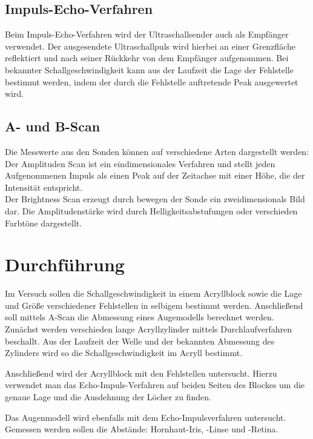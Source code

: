 \subsection{Impuls-Echo-Verfahren}
Beim Impuls-Echo-Verfahren wird der Ultraschallsender auch als Empfänger verwendet. Der ausgesendete Ultraschallpuls wird hierbei an einer Grenzfläche reflektiert und nach seiner Rückkehr von dem Empfänger aufgenommen. Bei bekannter Schallgeschwindigkeit kann aus der Laufzeit die Lage der Fehlstelle bestimmt werden, indem der durch die Fehlstelle auftretende Peak ausgewertet wird.

\subsection{A- und B-Scan}
Die Messwerte aus den Sonden können auf verschiedene Arten dargestellt werden:\\

Der Amplituden Scan ist ein eindimensionales Verfahren und stellt jeden Aufgenommenen Impuls als einen Peak auf der Zeitachse mit einer Höhe, die der Intensität entspricht.\\

Der Brightness Scan erzeugt durch bewegen der Sonde ein zweidimensionals Bild dar. Die Amplitudenstärke wird durch Helligkeitsabstufungen oder verschieden Farbtöne dargestellt.


\section{Durchführung}
Im Versuch sollen die Schallgeschwindigkeit in einem Acryllblock sowie die Lage und Größe verschiedener Fehlstellen in selbigem bestimmt werden. Anschließend soll mittels A-Scan die Abmessung eines Augemodells berechnet werden.\\

Zunächst werden verschieden lange Acryllzylinder mittels Durchlaufverfahren beschallt. Aus der Laufzeit der Welle und der bekannten Abmessung des Zylinders wird so die Schallgeschwindigkeit im Acryll bestimmt.

Anschließend wird der Acryllblock mit den Fehlstellen untersucht. Hierzu verwendet man das Echo-Impuls-Verfahren auf beiden Seiten des Blockes um die genaue Lage und die Ausdehnung der Löcher zu finden.

Das Augenmodell wird ebenfalls mit dem Echo-Impulsverfahren untersucht. Gemessen werden sollen die Abstände: Hornhaut-Iris, -Linse und -Retina.


